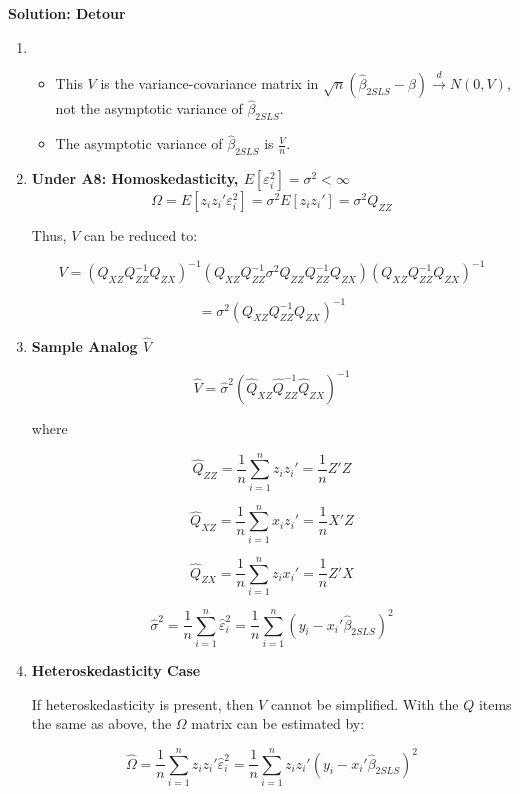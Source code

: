 \documentclass[12pt, oneside]{article}
\begin{document}
\textbf{Solution: Detour}
\begin{enumerate}
    \item 
    \begin{itemize}
    \item This \( V \) is the variance-covariance matrix in \( \sqrt{n} (\hat{\beta}_{2SLS} - \beta) \xrightarrow{d} N(0, V) \), not the asymptotic variance of \( \hat{\beta}_{2SLS} \).
    \item The asymptotic variance of \( \hat{\beta}_{2SLS} \) is \( \frac{V}{n} \).
\end{itemize}

\item \textbf{Under A8: Homoskedasticity, \( E[\varepsilon_i^2] = \sigma^2 < \infty \)}
\[
\Omega = E[z_i z_i' \varepsilon_i^2] = \sigma^2 E[z_i z_i'] = \sigma^2 Q_{ZZ}
\]

Thus, \( V \) can be reduced to:

\[
V = (Q_{XZ} Q_{ZZ}^{-1} Q_{ZX})^{-1} (Q_{XZ} Q_{ZZ}^{-1} \sigma^2 Q_{ZZ} Q_{ZZ}^{-1} Q_{ZX}) (Q_{XZ} Q_{ZZ}^{-1} Q_{ZX})^{-1}
\]

\[
= \sigma^2 (Q_{XZ} Q_{ZZ}^{-1} Q_{ZX})^{-1}
\]

\item \textbf{Sample Analog \( \hat{V} \)}

\[
\hat{V} = \hat{\sigma}^2 (\hat{Q}_{XZ} \hat{Q}_{ZZ}^{-1} \hat{Q}_{ZX})^{-1}
\]

where

\[
\hat{Q}_{ZZ} = \frac{1}{n} \sum_{i=1}^{n} z_i z_i' = \frac{1}{n} Z'Z
\]

\[
\hat{Q}_{XZ} = \frac{1}{n} \sum_{i=1}^{n} x_i z_i' = \frac{1}{n} X'Z
\]

\[
\hat{Q}_{ZX} = \frac{1}{n} \sum_{i=1}^{n} z_i x_i' = \frac{1}{n} Z'X
\]

\[
\hat{\sigma}^2 = \frac{1}{n} \sum_{i=1}^{n} \hat{\varepsilon}_i^2 = \frac{1}{n} \sum_{i=1}^{n} (y_i - x_i' \hat{\beta}_{2SLS})^2
\]

\item \textbf{Heteroskedasticity Case}

If heteroskedasticity is present, then \( V \) cannot be simplified. With the \( Q \) items the same as above, the \( \Omega \) matrix can be estimated by:

\[
\hat{\Omega} = \frac{1}{n} \sum_{i=1}^{n} z_i z_i' \hat{\varepsilon}_i^2 = \frac{1}{n} \sum_{i=1}^{n} z_i z_i' (y_i - x_i' \hat{\beta}_{2SLS})^2
\]

\end{enumerate}
\end{document}
